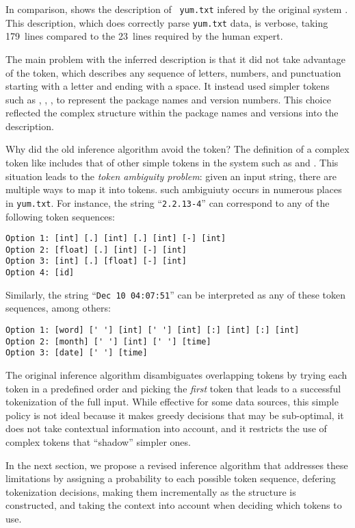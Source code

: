 In comparison,  shows the description of {\tt
  yum.txt} infered by the original \learnpads{} system
\cite{fisher+:dirttoshovels,fisher+:sigmod08}.  This description,
which does correctly parse \texttt{yum.txt} data, is verbose, taking
179~lines compared to the 23~lines required by the human expert.

The main problem with the inferred description is that it 
did not take advantage of the  token, which describes any
sequence of letters, numbers, and punctuation starting with a letter
and ending with a space. It instead 
used simpler tokens such as , , \etc,
to represent the package names and version numbers. 
This choice reflected the complex structure within the package names 
and versions into the description. 

Why did the old inference algorithm avoid the  token? 
The definition of a complex token like  includes that
of other simple tokens in the system such as  and
. This situation leads to the {\em token ambiguity problem}: 
given an input string, there are multiple ways to map it into tokens.
such ambiguiuty occurs in numerous places in {\tt yum.txt}.  For instance,
the string ``{\tt 2.2.13-4}'' can correspond to any of the following
token sequences: {\small
\begin{verbatim}
Option 1: [int] [.] [int] [.] [int] [-] [int]
Option 2: [float] [.] [int] [-] [int]
Option 3: [int] [.] [float] [-] [int]
Option 4: [id]
\end{verbatim}
}

Similarly, the string ``{\tt Dec 10 04:07:51}'' can be interpreted 
as any of these token sequences, among others:

{\small
\begin{verbatim}
Option 1: [word] [' '] [int] [' '] [int] [:] [int] [:] [int]
Option 2: [month] [' '] [int] [' '] [time]
Option 3: [date] [' '] [time]
\end{verbatim}
}

The original inference algorithm disambiguates overlapping
tokens by trying each token in a predefined order 
and picking the {\em first} token that leads to a successful
tokenization of the full input.
While effective for some data sources, this simple policy 
is not ideal because it makes greedy decisions that may be sub-optimal,
it does not take contextual information into account, and 
it restricts the use of complex tokens that ``shadow'' simpler ones.

In the next section, we propose a revised inference algorithm
that addresses these limitations by
assigning a probability to each possible token sequence,
defering tokenization decisions, making them
incrementally as the structure is constructed, and
taking the context into account when deciding which tokens to use.
